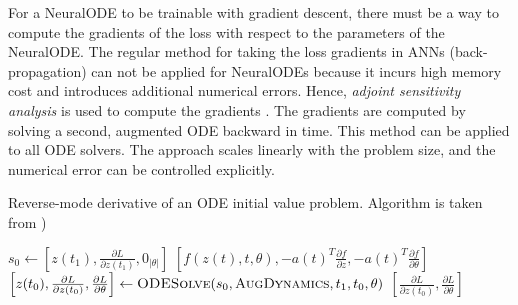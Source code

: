 For a \gls{NeuralODE} to be trainable with gradient descent, there must be a way to compute the gradients of the loss with respect to the parameters of the \gls{NeuralODE}.
The regular method for taking the loss gradients in \glspl{ANN} (back-propagation) can not be applied for \glspl{NeuralODE} because it incurs high memory cost and introduces additional numerical errors.
Hence, \textit{adjoint sensitivity analysis} is used to compute the gradients \cite{chenNeuralOrdinaryDifferential2019}.
The gradients are computed by solving a second, augmented \gls{ODE} backward in time.
This method can be applied to all \gls{ODE} solvers.
The approach scales linearly with the problem size, and the numerical error can be controlled explicitly.

\begin{algorithm}[h]
    \caption[NeuralODE reverse-mode automatic differentiation]{Reverse-mode derivative of an ODE initial value problem. Algorithm is taken from \cite{chenNeuralOrdinaryDifferential2019})}
    \label{alg:neural-ode-reverse-mode-diff}
    \begin{algorithmic}
            \State $s_0 \gets \left[z(t_1), \frac{\partial L}{\partial z(t_1)}, 0_{|\theta|}\right]$
                \State \Return $\left[f(z(t), t, \theta), -a(t)^T\frac{\partial f}{\partial z}, -a(t)^T\frac{\partial f}{\partial \theta}\right]$
            \EndFunction
            \State $\left[z(t_0), \frac{\partial L}{\partial z(t_0)}, \frac{\partial L}{\partial \theta}\right] \gets \Call{ODESolve}{s_0, \textproc{AugDynamics}, t_1, t_0, \theta}$
            \State \Return $\left[\frac{\partial L}{\partial z(t_0)}, \frac{\partial L}{\partial \theta}\right]$
        \EndFunction
    \end{algorithmic}
\end{algorithm}

